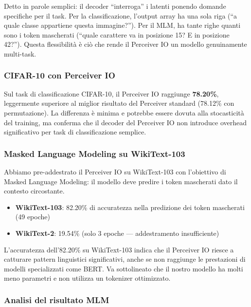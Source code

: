 \documentclass[12pt,a4paper]{article}
\begin{document}
Detto in parole semplici: il decoder ``interroga'' i latenti ponendo domande specifiche per il task. Per la classificazione, l'output array ha una sola riga (``a quale classe appartiene questa immagine?''). Per il MLM, ha tante righe quanti sono i token mascherati (``quale carattere va in posizione 15? E in posizione 42?''). Questa flessibilit\`a \`e ci\`o che rende il Perceiver IO un modello genuinamente multi-task.

\subsubsection{CIFAR-10 con Perceiver IO}

Sul task di classificazione CIFAR-10, il Perceiver IO raggiunge \textbf{78.20\%}, leggermente superiore al miglior risultato del Perceiver standard (78.12\% con permutazione). La differenza \`e minima e potrebbe essere dovuta alla stocasticit\`a del training, ma conferma che il decoder del Perceiver IO non introduce overhead significativo per task di classificazione semplice.

\subsubsection{Masked Language Modeling su WikiText-103}

Abbiamo pre-addestrato il Perceiver IO su WikiText-103 con l'obiettivo di Masked Language Modeling: il modello deve predire i token mascherati dato il contesto circostante.

\begin{formulabox}
\begin{itemize}
    \item \textbf{WikiText-103}: 82.20\% di accuratezza nella predizione dei token mascherati (49 epoche)
    \item \textbf{WikiText-2}: 19.54\% (solo 3 epoche --- addestramento insufficiente)
\end{itemize}
L'accuratezza dell'82.20\% su WikiText-103 indica che il Perceiver IO riesce a catturare pattern linguistici significativi, anche se non raggiunge le prestazioni di modelli specializzati come BERT. Va sottolineato che il nostro modello ha molti meno parametri e non utilizza un tokenizer ottimizzato.
\end{formulabox}

\subsubsection{Analisi del risultato MLM}
\end{document}
